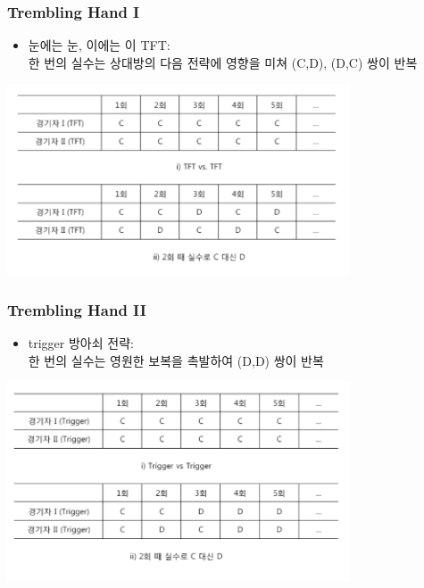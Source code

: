 \documentclass[final]{beamer}
\begin{document}
\begin{frame}\frametitle{Trembling Hand I}
	\begin{itemize}\large
	\item 눈에는 눈, 이에는 이 TFT: \\ 
	\color{blue} 한 번의 실수는 상대방의 다음 전략에 영향을 미쳐 (C,D), (D,C) 쌍이 반복 \\ 
	\end{itemize}
	\begin{center}
		\includegraphics[width=4in]{tft01.png}
	\end{center}
\end{frame}

\begin{frame}\frametitle{Trembling Hand II}%
\begin{itemize}\large
\item trigger 방아쇠 전략: \\ 
\color{blue} 한 번의 실수는 영원한 보복을 촉발하여 (D,D) 쌍이 반복 \\
\end{itemize}
\begin{center}
\includegraphics[width=4in]{trigger01.png}
\end{center}
\end{frame}
\end{document}
